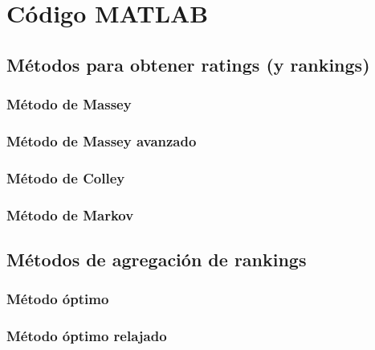 \chapter{Código MATLAB}

\section{Métodos para obtener ratings (y rankings)}

\subsection*{Método de Massey}



\subsection*{Método de Massey avanzado}

\subsection*{Método de Colley}



\subsection*{Método de Markov}



\section{Métodos de agregación de rankings}

\subsection*{Método óptimo}



\subsection*{Método óptimo relajado}



